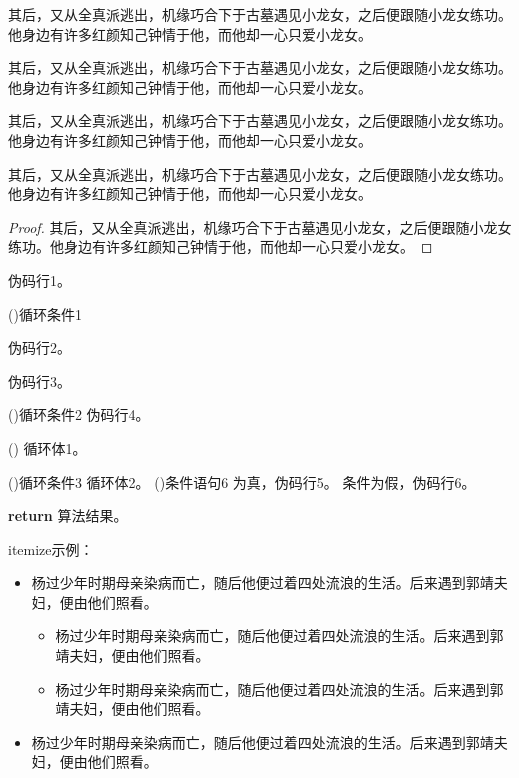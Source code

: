 \documentclass[doctor, vlined, ]{DissertUESTC}
\begin{document}
	\begin{lemma}[名称]
		其后，又从全真派逃出，机缘巧合下于古墓遇见小龙女，之后便跟随小龙女练功。他身边有许多红颜知己钟情于他，而他却一心只爱小龙女。
	\end{lemma}

	\begin{example}[名称]
		其后，又从全真派逃出，机缘巧合下于古墓遇见小龙女，之后便跟随小龙女练功。他身边有许多红颜知己钟情于他，而他却一心只爱小龙女。
	\end{example}

	\begin{assumption}[名称]
		其后，又从全真派逃出，机缘巧合下于古墓遇见小龙女，之后便跟随小龙女练功。他身边有许多红颜知己钟情于他，而他却一心只爱小龙女。
	\end{assumption}

	\begin{annotation}[名称]
		其后，又从全真派逃出，机缘巧合下于古墓遇见小龙女，之后便跟随小龙女练功。他身边有许多红颜知己钟情于他，而他却一心只爱小龙女。
	\end{annotation}
	
	\begin{proof}
		其后，又从全真派逃出，机缘巧合下于古墓遇见小龙女，之后便跟随小龙女练功。他身边有许多红颜知己钟情于他，而他却一心只爱小龙女。
	\end{proof}
	

	\begin{algo}[!h]
		\caption{algo环境伪码示例}

		伪码行1。
		
		\For(){循环条件1}{
			伪码行2。
			
			伪码行3。
			
			\DoWhile(){循环条件2}{
				伪码行4。
			}
			
			\Loop(){
				循环体1。
			}
			
			\Repeat(){循环条件3}{
				循环体2。
			}
			\eIf(){条件语句6}{
				为真，伪码行5。
			}{
				条件为假，伪码行6。
			}
		}
		\textbf{return} 算法结果。
	\end{algo}
	

	itemize示例：

	\begin{itemize}
		\item 杨过少年时期母亲染病而亡，随后他便过着四处流浪的生活。后来遇到郭靖夫妇，便由他们照看。
		\begin{itemize}
			\item 杨过少年时期母亲染病而亡，随后他便过着四处流浪的生活。后来遇到郭靖夫妇，便由他们照看。
			\item 杨过少年时期母亲染病而亡，随后他便过着四处流浪的生活。后来遇到郭靖夫妇，便由他们照看。
		\end{itemize}
		\item 杨过少年时期母亲染病而亡，随后他便过着四处流浪的生活。后来遇到郭靖夫妇，便由他们照看。
	\end{itemize}
\end{document}
